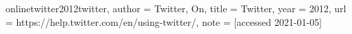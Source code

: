 online{twitter2012twitter,
	author = {Twitter, On},
	title = {Twitter},
	year = {2012},
	url = {https://help.twitter.com/en/using-twitter/},
	note = {[accessed 2021-01-05]}
}
